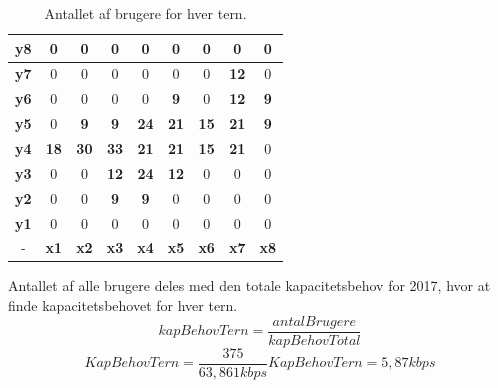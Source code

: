 \begin{table}[h]\label{tab:antalPrTern}
	\centering
    \begin{tabular}{|c|c|c|c|c|c|c|c|c|}
    \hline
    \textbf{y8} & 0  & 0  & 0  & 0  & 0  & 0  & 0  & 0  \\ \hline
    \textbf{y7} & 0  & 0  & 0  & 0  & 0  & 0  & \textbf{12} & 0  \\ \hline
    \textbf{y6} & 0  & 0  & 0  & 0  & \textbf{9}  & 0  & \textbf{12} & \textbf{9}  \\ \hline
    \textbf{y5} & 0  & \textbf{9}  & \textbf{9}  & \textbf{24} & \textbf{21} & \textbf{15} & \textbf{21} & \textbf{9}  \\ \hline
    \textbf{y4} & \textbf{18} & \textbf{30} & \textbf{33} & \textbf{21} & \textbf{21} & \textbf{15} & \textbf{21} & 0  \\ \hline
    \textbf{y3} & 0  & 0  & \textbf{12} & \textbf{24} & \textbf{12} & 0  & 0  & 0  \\ \hline
    \textbf{y2} & 0  & 0  & \textbf{9}  & \textbf{9}  & 0  & 0  & 0  & 0  \\ \hline
    \textbf{y1} & 0  & 0  & 0  & 0  & 0  & 0  & 0  & 0  \\ \hline
    -  & \textbf{x1} & \textbf{x2} & \textbf{x3} & \textbf{x4} & \textbf{x5} & \textbf{x6} & \textbf{x7} & \textbf{x8} \\ \hline
    \end{tabular}
    \caption{Antallet af brugere for hver tern.}
\end{table}

Antallet af alle brugere deles med den totale kapacitetsbehov for 2017, hvor at finde kapacitetsbehovet for hver tern. 
\begin{equation}
	kapBehovTern = \frac{antalBrugere}{kapBehovTotal}
\end{equation}
\begin{equation}
	KapBehovTern = \frac{375}{63,861 kbps}
	KapBehovTern = 5,87 kbps
\end{equation}

